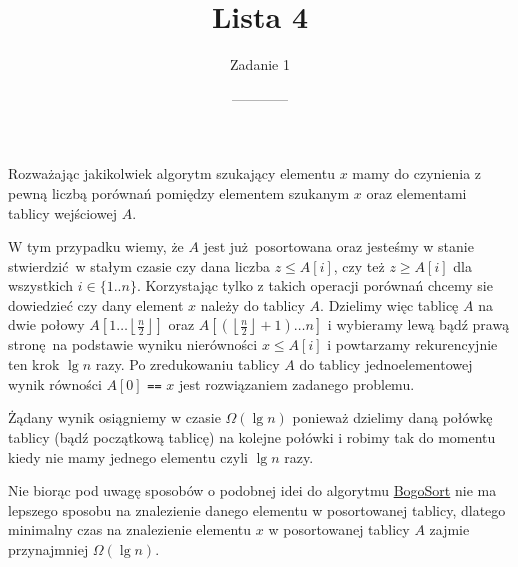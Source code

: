 \documentclass[14pt]{article}
\title{Lista 4}
\author{Zadanie 1}
\date{------------}
\begin{document}
\maketitle

Rozważając jakikolwiek algorytm szukający elementu $x$ mamy do czynienia z pewną liczbą porównań pomiędzy elementem szukanym $x$ oraz elementami tablicy wejściowej $A$.

W tym przypadku wiemy, że $A$ jest już posortowana oraz jesteśmy w stanie stwierdzić w stałym czasie czy dana liczba $z \le A[i]$, czy też $z \ge A[i]$ dla wszystkich $i \in \{1..n\}$. Korzystając tylko z takich operacji porównań chcemy sie dowiedzieć czy dany element $x$ należy do tablicy $A$. Dzielimy więc tablicę $A$ na dwie połowy $A\left[1\dots \left\lfloor \frac{n}{2} \right\rfloor\right]$ oraz $A\left[\left(\left\lfloor \frac{n}{2} \right\rfloor +1\right) \dots n\right]$ i wybieramy lewą bądź prawą stronę na podstawie wyniku nierówności $x \le A[i]$ i powtarzamy rekurencyjnie ten krok $\lg n$ razy. Po zredukowaniu tablicy $A$ do tablicy jednoelementowej wynik równości $A[0]$ \texttt{==} $x$ jest rozwiązaniem zadanego problemu.

Żądany wynik osiągniemy w czasie $\Omega(\lg n)$ ponieważ dzielimy daną połówkę tablicy (bądź początkową tablicę) na kolejne połówki i robimy tak do momentu kiedy nie mamy jednego elementu czyli $\lg n$ razy.

Nie biorąc pod uwagę sposobów o podobnej idei do algorytmu \href{https://en.wikipedia.org/wiki/Bogosort}{BogoSort} nie ma lepszego sposobu na znalezienie danego elementu w posortowanej tablicy, dlatego minimalny czas na znalezienie elementu $x$ w posortowanej tablicy $A$ zajmie przynajmniej $\Omega(\lg n)$.
\end{document}
